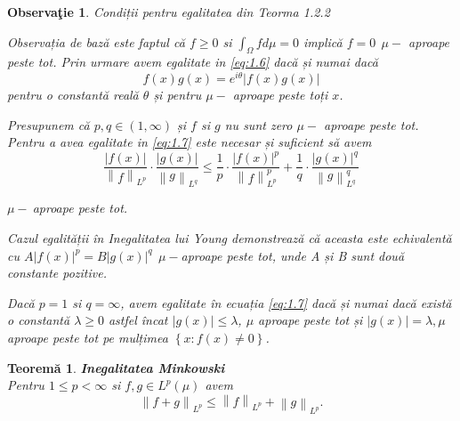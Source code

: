 \documentclass[a4paper,12pt,oneside]{report}
\newtheorem{theorem}{Teorem\u a}
\newtheorem{remark}{Observa\c{t}ie}
\begin{document}
\begin{remark}

Condiții pentru egalitatea din Teorma 1.2.2

Observația de bază este faptul că  \(f\geq 0\) si \(\int_{\Omega }f d\mu  = 0\) implică \(f = 0~~ \mu-\) aproape peste tot.
	Prin urmare avem egalitate in \ref{eq:1.6} dacă și numai dacă
\begin{displaymath}
  f\left ( x \right )g\left ( x \right ) = e^{i\theta }\left | f\left ( x \right ) g\left ( x \right )\right |
\end{displaymath}
pentru o constantă reală \(\theta\) și pentru \(\mu-\) aproape peste toți \(x\).


	Presupunem că \(p , q \in \left ( 1 , \infty  \right )\) și \(f\) si \(g\) nu sunt zero \(\mu-\) aproape peste tot. Pentru a avea egalitate in \ref{eq:1.7} este necesar și suficient să avem
\begin{displaymath}
  \frac{\left | f\left ( x \right ) \right |}{\left \| f \right \|_{L^{p}}} \cdot \frac{\left | g\left ( x \right ) \right |}{\left \| g \right \|_{L^{q}}}\leq \frac{1}{p}\cdot \frac{\left | f\left ( x \right ) \right |^{p}}{\left \| f \right \|^{p}_{L^{p}}} + \frac{1}{q}\cdot \frac{\left | g\left ( x \right ) \right |^{q}}{\left \| g \right \|^{q}_{L^{q}}}
\end{displaymath}

\(\mu-~\)aproape peste tot.

Cazul egalității în Inegalitatea lui Young demonstrează că aceasta este echivalentă cu \(A\left | f\left ( x \right ) \right |^{p} = B\left | g\left ( x \right ) \right |^{q}~~ \mu-\)aproape peste tot,
unde A și B sunt două constante pozitive.

	Dacă \(p = 1\) si \(q = \infty\), avem egalitate în ecuația \ref{eq:1.7} dacă și numai dacă există o constantă \(\lambda \geq 0\) astfel încat \(\left | g\left ( x \right ) \right |\leq \lambda\),  \(\mu\) aproape peste tot și \(\left | g\left ( x \right ) \right |= \lambda,  \mu\) aproape peste tot pe mulțimea \(\left \{ x : f\left ( x \right )\neq 0 \right \}\).
\end{remark}
\begin{theorem}
\textbf{Inegalitatea Minkowski}\\

Pentru \(1\leq  p < \infty\) si \(f , g \in L^{p}\left ( \mu  \right ) \) avem
\begin{displaymath}
  \left \| f + g  \right \|_{L^{p}}\leq \left \| f \right \|_{L^{p}} + \left \| g \right \|_{L^{p}}. \label{eq:1.10} \tag{1.10}
\end{displaymath}
\end{theorem}
\end{document}

